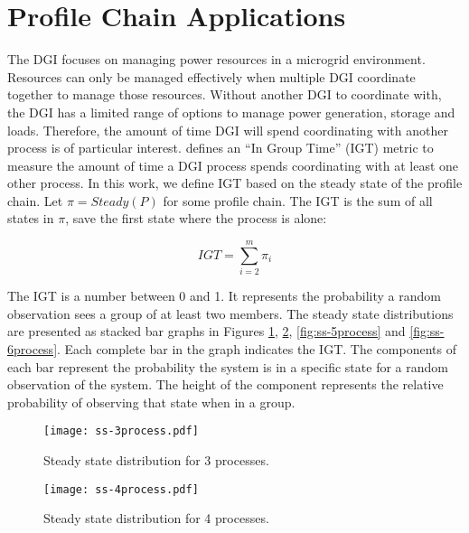 
\section{Profile Chain Applications}


The DGI focuses on managing power resources in a microgrid environment.
Resources can only be managed effectively when multiple DGI coordinate together to manage those resources.
Without another DGI to coordinate with, the DGI has a limited range of options to manage power generation, storage and loads.
Therefore, the amount of time DGI will spend coordinating with another process is of particular interest.
\cite{CRITIS2012} defines an ``In Group Time'' (IGT) metric to measure the amount of time a DGI process spends coordinating with at least one other process.
In this work, we define IGT based on the steady state of the profile chain.
Let $\pi=Steady(P)$ for some profile chain.
The IGT is the sum of all states in $\pi$, save the first state where the process is alone:

\[ IGT = \sum_{i=2}^{m} \pi_i \]

The IGT is a number between 0 and 1.
It represents the probability a random observation sees a group of at least two members.
The steady state distributions are presented as stacked bar graphs in Figures \ref{fig:ss-3process}, \ref{fig:ss-4process}, \ref{fig:ss-5process} and \ref{fig:ss-6process}.
Each complete bar in the graph indicates the IGT.
The components of each bar represent the probability the system is in a specific state for a random observation of the system.
The height of the component represents the relative probability of observing that state when in a group.

\begin{figure}
    \centering
    \texttt{[image: ss-3process.pdf]}
    \caption{Steady state distribution for 3 processes.}
    \label{fig:ss-3process}
\end{figure}

\begin{figure}
    \centering
    \texttt{[image: ss-4process.pdf]}
    \caption{Steady state distribution for 4 processes.}
    \label{fig:ss-4process}
\end{figure}

